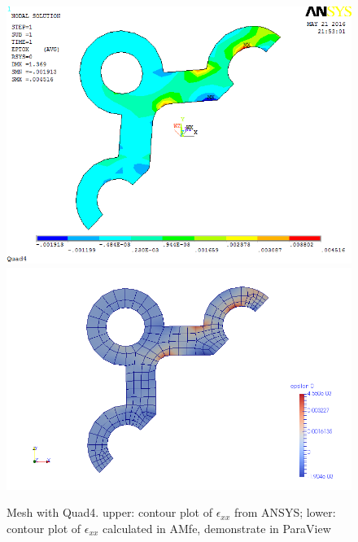 \begin{figure}[htbp]
	\begin{center}
		\includegraphics[width=13cm,clip]{Quad4_Exx.png} 		
		\includegraphics[width=13cm,clip]{Quad4_Exx_P.png} 		
		\caption{Mesh with Quad4. upper: contour plot of $\epsilon_{xx}$ from ANSYS; lower: contour plot of $\epsilon_{xx}$ calculated in AMfe, demonstrate in ParaView} \label{fig: Quad4_Exx}
	\end{center}
\end{figure}
\clearpage 

